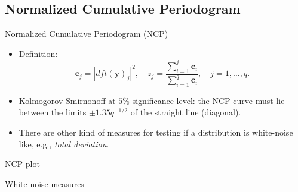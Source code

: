 \documentclass{beamer}
\begin{document}
\subsection{Normalized Cumulative Periodogram}
\begin{frame}{Normalized Cumulative Periodogram (NCP)}
  \begin{itemize}
    \item Definition:
      \begin{equation*}
	\mathbf{c}_{j} = |dft(\mathbf{y})_{j}|^{2}, \quad z_{j} =
	\frac{\sum_{i=1}^{j}\mathbf{c}_{i}}{\sum_{i=1}^{q}\mathbf{c}_{i}},
	\quad j = 1,\ldots,q.
      \end{equation*}

    \item Kolmogorov-Smirnonoff at $5\%$ significance level: the NCP curve must
      lie between the limits $\pm 1.35q^{-1/2}$ of the straight line (diagonal).

    \item There are other kind of measures for testing if a distribution is
      white-noise like, e.g., \emph{total deviation}.
    \end{itemize}
\end{frame}

\begin{frame}{NCP plot}
  \begin{center}
  \end{center}
\end{frame}

\begin{frame}{White-noise measures}
  \begin{center}
  \end{center}
\end{frame}
\end{document}
